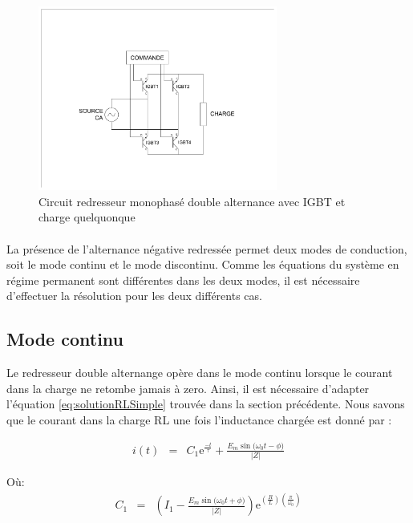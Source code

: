 \begin{figure}[htb!]
  \begin{center}  
    \includegraphics[width=0.7\textwidth]{Circuit/RedresseurMonophaseDoubleAlternanceIGBT}
    \caption{Circuit redresseur monophasé double alternance avec IGBT et charge quelquonque}
    \label{fig:RedresseurMonophaseDoubleAlternanceIGBT}
  \end{center}   
\end{figure}

\paragraph{}
La présence de l'alternance négative redressée permet deux modes de conduction, soit le mode continu et le mode discontinu. Comme les équations du système en régime permanent sont différentes dans les deux modes, il est nécessaire d'effectuer la résolution pour les deux différents cas.

\subsection{Mode continu}
Le redresseur double alternange opère dans le mode continu lorsque le courant dans la charge ne retombe jamais à zero. Ainsi, il est nécessaire d'adapter l'équation \ref{eq:solutionRLSimple} trouvée dans la section précédente. Nous savons que le courant dans la charge RL une fois l'inductance chargée est donné par :

\begin{eqnarray}
\label{eq:RedresseurMonophaseDoubleAlternanceContinu1}
i(t) &=& C_1\mbox{e}^{\frac{-t}{\tau}} + \frac{E_m\sin{(\omega_0 t - \phi})}{|Z|}
\end{eqnarray}

Où:
\begin{eqnarray}
C_1 &=& \left( I_1 - \frac{E_m\sin{(\omega_0 t + \phi})}{|Z|}\right)\mbox{e}^{\left(\frac{R}{L}\right)\left(\frac{\pi}{\omega_0}\right)}
\end{eqnarray}

